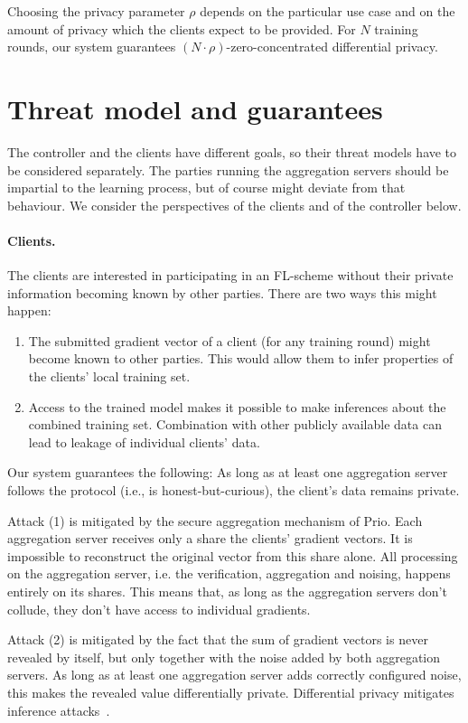 \documentclass{article}
\begin{document}
Choosing the privacy parameter $\rho$ depends on the particular use case and on
the amount of privacy which the clients expect to be provided. For $N$ training
rounds, our system guarantees $(N \cdot \rho)$-zero-concentrated
differential privacy.

\section{Threat model and guarantees}
The controller and the clients have different goals, so their threat models
have to be considered separately. The parties running the aggregation
servers should be impartial to the learning process, but of course might deviate
from that behaviour. We consider the perspectives of the clients
and of the controller below.

\paragraph{Clients.} The clients are interested in participating in an FL-scheme
without their private information becoming known by other parties. There are two
ways this might happen:
\begin{enumerate}
\item The submitted gradient vector of a client (for any training round) might
  become known to other parties. This would allow them to infer properties of
  the clients' local training set.
\item Access to the trained model makes it possible to make inferences about the
  combined training set. Combination with other publicly available data can lead to
  leakage of individual clients' data.
\end{enumerate}
Our system guarantees the following: As long as at least one aggregation server
follows the protocol (i.e., is honest-but-curious), the client's data remains
private.

Attack (1) is mitigated by the secure aggregation mechanism of Prio.
Each aggregation server receives only a share
the clients' gradient vectors. It is impossible to reconstruct the original
vector from this share alone. All processing on the aggregation server, i.e.
the verification, aggregation and noising, happens entirely on its shares.
This means that, as long as the aggregation servers don't collude, they don't
have access to individual gradients.

Attack (2) is mitigated by the fact that the sum of
gradient vectors is never revealed by itself, but only together with the noise added by
both aggregation servers. As long as at least one aggregation server adds
correctly configured noise, this makes the revealed value differentially
private. Differential privacy mitigates inference attacks~\cite{MIA-DP1,MIA-DP2,MIA-DP3}.
\end{document}
